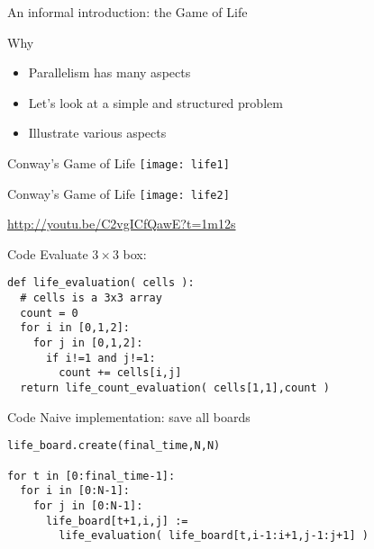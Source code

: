 
 {An informal introduction: the Game of Life}

\begin{frame}{Why}
  \begin{itemize}
  \item Parallelism has many aspects
  \item Let's look at a simple and structured problem
  \item Illustrate various aspects
  \end{itemize}
\end{frame}

\begin{frame}{Conway's Game of Life}
  \texttt{[image: life1]}
\end{frame}

\begin{frame}{Conway's Game of Life}
  \texttt{[image: life2]}

  \url{http://youtu.be/C2vgICfQawE?t=1m12s}
\end{frame}

\begin{frame}[fragile]{Code}
Evaluate $3\times3$ box:
\begin{verbatim}
def life_evaluation( cells ):
  # cells is a 3x3 array
  count = 0
  for i in [0,1,2]:
    for j in [0,1,2]:
      if i!=1 and j!=1:
        count += cells[i,j]
  return life_count_evaluation( cells[1,1],count )
\end{verbatim}
\end{frame}

\begin{frame}[fragile]{Code}
Naive implementation: save all boards
\begin{verbatim}
life_board.create(final_time,N,N)

for t in [0:final_time-1]:
  for i in [0:N-1]:
    for j in [0:N-1]:
      life_board[t+1,i,j] := 
        life_evaluation( life_board[t,i-1:i+1,j-1:j+1] )
\end{verbatim}
\end{frame}

